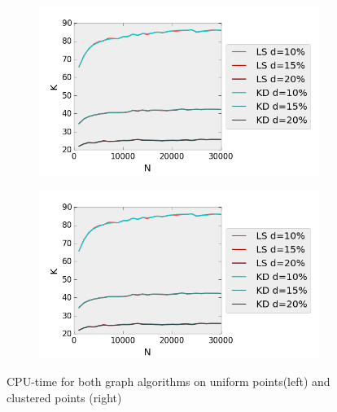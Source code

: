 \begin{figure}[H] 
  \begin{subfigure}[b]{0.5\linewidth}
    \centering
    \includegraphics[width=0.9\linewidth]{Pictures/unif_kd_ls_k} 
    \label{fig:unif_kd_ls_k} 
    \vspace{4ex}
  \end{subfigure}%
  \begin{subfigure}[b]{0.5\linewidth}
    \centering
    \includegraphics[width=0.9\linewidth]{Pictures/unif_kd_ls_k} 
    \label{fig:clus_kd_ls_k} 
    \vspace{4ex}
  \end{subfigure}
  \caption{CPU-time for both graph algorithms on uniform points(left) and clustered points (right)}
  \label{fig:kd_ls_k} 
\end{figure}

